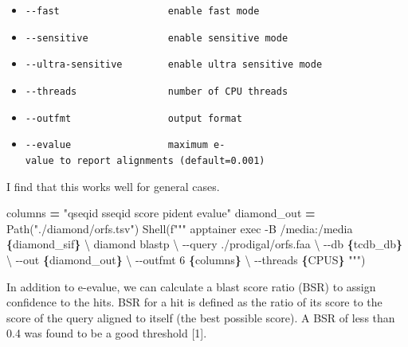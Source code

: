 \documentclass[
]{book}
\newenvironment{Shaded}{\begin{snugshade}}{\end{snugshade}}
\newcommand{\CharTok}[1]{\textcolor[rgb]{0.31,0.60,0.02}{#1}}
\newcommand{\NormalTok}[1]{#1}
\newcommand{\OperatorTok}[1]{\textcolor[rgb]{0.81,0.36,0.00}{\textbf{#1}}}
\newcommand{\SpecialCharTok}[1]{\textcolor[rgb]{0.81,0.36,0.00}{\textbf{#1}}}
\newcommand{\SpecialStringTok}[1]{\textcolor[rgb]{0.31,0.60,0.02}{#1}}
\newcommand{\StringTok}[1]{\textcolor[rgb]{0.31,0.60,0.02}{#1}}
\providecommand{\tightlist}{%
  \setlength{\itemsep}{0pt}\setlength{\parskip}{0pt}}
\begin{document}
\begin{itemize}
\tightlist
\item
  \texttt{-\/-fast\ \ \ \ \ \ \ \ \ \ \ \ \ \ \ \ \ \ \ enable\ fast\ mode}
\item
  \texttt{-\/-sensitive\ \ \ \ \ \ \ \ \ \ \ \ \ \ enable\ sensitive\ mode}
\item
  \texttt{-\/-ultra-sensitive\ \ \ \ \ \ \ \ enable\ ultra\ sensitive\ mode}
\item
  \texttt{-\/-threads\ \ \ \ \ \ \ \ \ \ \ \ \ \ \ \ number\ of\ CPU\ threads}
\item
  \texttt{-\/-outfmt\ \ \ \ \ \ \ \ \ \ \ \ \ \ \ \ \ output\ format}
\item
  \texttt{-\/-evalue\ \ \ \ \ \ \ \ \ \ \ \ \ \ \ \ \ maximum\ e-value\ to\ report\ alignments\ (default=0.001)}
\end{itemize}

I find that this works well for general cases.

\begin{Shaded}
\begin{Highlighting}[numbers=left,,]
\NormalTok{columns }\OperatorTok{=} \StringTok{"qseqid sseqid score pident evalue"}
\NormalTok{diamond\_out }\OperatorTok{=}\NormalTok{ Path(}\StringTok{"./diamond/orfs.tsv"}\NormalTok{)}
\NormalTok{Shell(}\SpecialStringTok{f"""}
\SpecialStringTok{apptainer exec {-}B /media:/media }\SpecialCharTok{\{}\NormalTok{diamond\_sif}\SpecialCharTok{\}}\SpecialStringTok{ }\CharTok{\textbackslash{}}
\SpecialStringTok{    diamond blastp }\CharTok{\textbackslash{}}
\SpecialStringTok{        {-}{-}query ./prodigal/orfs.faa }\CharTok{\textbackslash{}}
\SpecialStringTok{        {-}{-}db }\SpecialCharTok{\{}\NormalTok{tcdb\_db}\SpecialCharTok{\}}\SpecialStringTok{ }\CharTok{\textbackslash{}}
\SpecialStringTok{        {-}{-}out }\SpecialCharTok{\{}\NormalTok{diamond\_out}\SpecialCharTok{\}}\SpecialStringTok{ }\CharTok{\textbackslash{}}
\SpecialStringTok{        {-}{-}outfmt 6 }\SpecialCharTok{\{}\NormalTok{columns}\SpecialCharTok{\}}\SpecialStringTok{ }\CharTok{\textbackslash{}}
\SpecialStringTok{        {-}{-}threads }\SpecialCharTok{\{}\NormalTok{CPUS}\SpecialCharTok{\}}
\SpecialStringTok{"""}\NormalTok{)}
\end{Highlighting}
\end{Shaded}

In addition to e-evalue, we can calculate a blast score ratio (BSR) to assign confidence to the hits.
BSR for a hit is defined as the ratio of its score to the score of the query aligned to itself (the best possible score).
A BSR of less than 0.4 was found to be a good threshold {[}1{]}.
\end{document}
